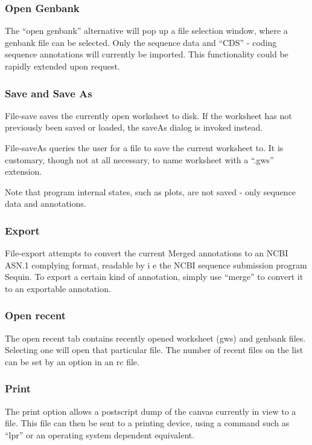 \subsubsection{Open Genbank}

The ``open genbank'' alternative will pop up a file selection window,
where a genbank file can be selected. Only the sequence data and
``CDS'' - coding sequence annotations will currently be imported. This
functionality could be rapidly extended upon request.

\subsubsection{Save and Save As}

File-save saves the currently open worksheet to disk. If the worksheet
has not previously been saved or loaded, the saveAs dialog is invoked
instead.

File-saveAs queries the user for a file to save the current worksheet
to. It is customary, though not at all necessary, to name worksheet
with a ``.gws'' extension.

Note that program internal states, such as plots, are not saved - only
sequence data and annotations.

\subsubsection{Export}

File-export attempts to convert the current Merged annotations to an
NCBI ASN.1 complying format, readable by i e the NCBI sequence
submission program Sequin. To export a certain kind of annotation, simply use
``merge'' to convert it to an exportable annotation.

\subsubsection{Open recent}

The open recent tab contains recently opened worksheet (gws) and
genbank files.  Selecting one will open that particular file. The
number of recent files on the list can be set by an option in an rc
file.

\subsubsection{Print}

The print option allows a postscript dump of the canvas currently in
view to a file. This file can then be sent to a printing device, using
a command such as ``lpr'' or an operating system dependent equivalent.

